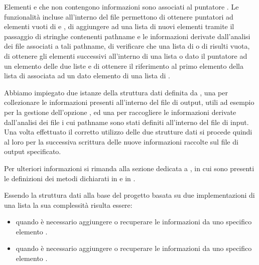 \documentclass[letterpaper,10pt,italian,openany,oneside]{sphinxmanual}
\begin{document}
Elementi  e  che non contengono informazioni sono associati al puntatore .
Le funzionalità incluse all’interno del file  permettono di ottenere puntatori ad elementi vuoti di  e , di aggiungere ad una lista di 
nuovi elementi tramite il passaggio di stringhe contenenti pathname e le informazioni derivate dall’analisi dei file associati a tali pathname, di verificare che una lista di 
o di  risulti vuota, di ottenere gli elementi successivi all’interno di una lista  o  dato il puntatore ad un elemento delle due liste e di ottenere
il riferimento al primo elemento della lista di  associata ad un dato elemento di una lista di .

Abbiamo impiegato due istanze della struttura dati definita da , una per collezionare le informazioni presenti all’interno del file di output,
utili ad esempio per la gestione dell’opzione , ed una per raccogliere le informazioni derivate dall’analisi dei file i cui pathname sono stati
definiti all’interno del file di input. Una volta effettuato il corretto utilizzo delle due strutture dati si procede quindi al loro  per la successiva
scrittura delle nuove informazioni raccolte sul file di output specificato.

Per ulteriori informazioni si rimanda alla sezione dedicata a , in cui sono presenti le definizioni dei metodi dichiarati in  e in .

Essendo la struttura dati alla base del progetto basata su due implementazioni di una lista la sua complessità risulta essere:
\begin{itemize}
\item {} 
 quando è necessario aggiungere o recuperare le informazioni da uno specifico elemento .

\item {} 
 quando è necessario aggiungere o recuperare le informazioni da uno specifico elemento .

\end{itemize}
\end{document}
